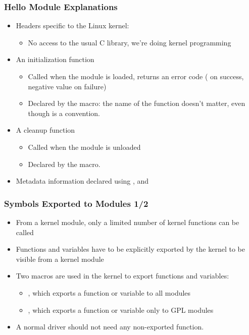 \begin{frame}
  \frametitle{Hello Module Explanations}
  \begin{itemize}
  \item Headers specific to the Linux kernel: 
    \begin{itemize}
    \item No access to the usual C library, we're doing kernel
      programming
    \end{itemize}
  \item An initialization function
    \begin{itemize}
    \item Called when the module is loaded, returns an error code
      ( on success, negative value on failure)
    \item Declared by the  macro: the name of the
      function doesn't matter, even though 
      is a convention.
    \end{itemize}
  \item A cleanup function
    \begin{itemize}
    \item Called when the module is unloaded
    \item Declared by the  macro.
    \end{itemize}
  \item Metadata information declared using ,
     and 
  \end{itemize}
\end{frame}

\begin{frame}
  \frametitle{Symbols Exported to Modules 1/2}
  \begin{itemize}
  \item From a kernel module, only a limited number of kernel
    functions can be called
  \item Functions and variables have to be explicitly exported by the
    kernel to be visible from a kernel module
  \item Two macros are used in the kernel to export functions and
    variables:
    \begin{itemize}
    \item {}, which exports a function
      or variable to all modules
    \item {}, which exports a
      function or variable only to GPL modules
    \end{itemize}
  \item A normal driver should not need any non-exported function.
  \end{itemize}
\end{frame}

